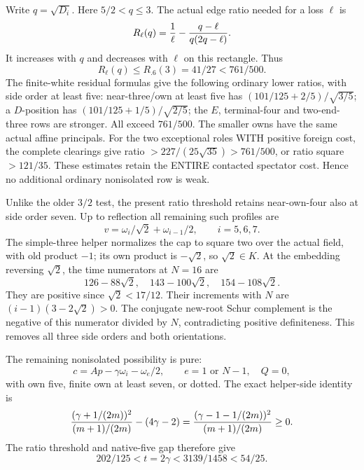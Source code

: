 \documentclass[11pt]{article}
\begin{document}
Write \(q=\sqrt{D_i}\).  Here \(5/2<q\le3\).
The actual edge ratio needed for a loss \(\ell\) is
\[
 R_\ell(q)={1\over\ell}
                -{q-\ell\over q(2q-\ell)}.
\]
It increases with \(q\) and decreases with \(\ell\) on this
rectangle.  Thus
\[
 R_\ell(q)\le R_{.6}(3)=41/27<761/500.
\]
The finite-white residual formulas give the following ordinary
lower ratios, with side order at least five:
near-three/own at least five has
\((101/125+2/5)/\sqrt{3/5}\);
a \(D\)-position has
\((101/125+1/5)/\sqrt{2/5}\);
the \(E\), terminal-four and two-end-three rows are stronger.
All exceed \(761/500\).
The smaller owns have the same actual affine principals.
For the two exceptional roles WITH positive foreign cost,
the complete clearings give ratio
\(>227/(25\sqrt{35})>761/500\), or ratio square \(>121/35\).
These estimates retain the ENTIRE contacted spectator cost.
Hence no additional ordinary nonisolated row is weak.

Unlike the older \(3/2\) test, the present ratio threshold retains
near-own-four also at side order seven.  Up to reflection all
remaining such profiles are
\[
          v=\omega_i/\sqrt2+\omega_{i-1}/2,\qquad i=5,6,7 .
\]
The simple-three helper normalizes the cap to square two over the
actual field, with old product \(-1\); its own product is
\(-\sqrt2\), so \(\sqrt2\in K\).
At the embedding reversing \(\sqrt2\), the time numerators at
\(N=16\) are
\[
        126-88\sqrt2,\quad143-100\sqrt2,\quad154-108\sqrt2 .
\]
They are positive since \(\sqrt2<17/12\).
Their increments with \(N\) are
\((i-1)(3-2\sqrt2)>0\).
The conjugate new-root Schur complement is the negative of this
numerator divided by \(N\), contradicting positive definiteness.
This removes all three side orders and both orientations.

The remaining nonisolated possibility is pure:
\[
 c=Ap-\gamma\omega_i-\omega_e/2,\qquad
 e=1\text{ or }N-1,\quad Q=0,
\]
with own five, finite own at least seven, or dotted.
The exact helper-side identity is
\[
 {(\gamma+1/(2m))^2\over(m+1)/(2m)}-(4\gamma-2)
 ={(\gamma-1-1/(2m))^2\over(m+1)/(2m)}\ge0.
\]
The ratio threshold and native-five gap therefore give
\[
             202/125<t=2\gamma<3139/1458<54/25.
\tag{Astrip}\label{eq:arithAhelperphysical}
\]
\end{document}
